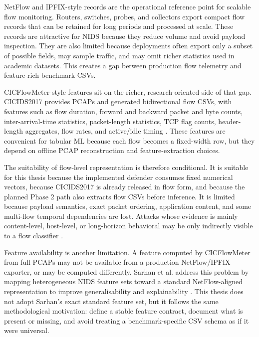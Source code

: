 NetFlow and IPFIX-style records are the operational reference point for scalable flow monitoring. Routers, switches, probes, and collectors export compact flow records that can be retained for long periods and processed at scale. These records are attractive for NIDS because they reduce volume and avoid payload inspection. They are also limited because deployments often export only a subset of possible fields, may sample traffic, and may omit richer statistics used in academic datasets. This creates a gap between production flow telemetry and feature-rich benchmark CSVs.

CICFlowMeter-style features sit on the richer, research-oriented side of that gap. CICIDS2017 provides PCAPs and generated bidirectional flow CSVs, with features such as flow duration, forward and backward packet and byte counts, inter-arrival-time statistics, packet-length statistics, TCP flag counts, header-length aggregates, flow rates, and active/idle timing \parencite{Sharafaldin2018CICIDS2017,Lashkari2017CICFlowMeter,CICIDS2017Web}. These features are convenient for tabular ML because each flow becomes a fixed-width row, but they depend on offline PCAP reconstruction and feature-extraction choices.

The suitability of flow-level representation is therefore conditional. It is suitable for this thesis because the implemented defender consumes fixed numerical vectors, because CICIDS2017 is already released in flow form, and because the planned Phase 2 path also extracts flow CSVs before inference. It is limited because payload semantics, exact packet ordering, application content, and some multi-flow temporal dependencies are lost. Attacks whose evidence is mainly content-level, host-level, or long-horizon behavioral may be only indirectly visible to a flow classifier \parencite{Sperotto2010FlowIDS,Umer2017FlowIDS}.

Feature availability is another limitation. A feature computed by CICFlowMeter from full PCAPs may not be available from a production NetFlow/IPFIX exporter, or may be computed differently. Sarhan et al. address this problem by mapping heterogeneous NIDS feature sets toward a standard NetFlow-aligned representation to improve generalisability and explainability \parencite{Sarhan2021}. This thesis does not adopt Sarhan's exact standard feature set, but it follows the same methodological motivation: define a stable feature contract, document what is present or missing, and avoid treating a benchmark-specific CSV schema as if it were universal.

